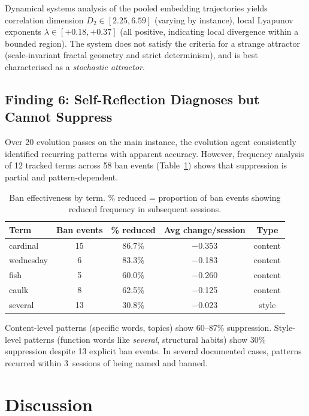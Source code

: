 \documentclass{article}
\begin{document}
Dynamical systems analysis of the pooled embedding trajectories yields
correlation dimension $D_2 \in [2.25, 6.59]$ (varying by instance), local
Lyapunov exponents $\lambda \in [+0.18, +0.37]$ (all positive, indicating
local divergence within a bounded region). The system does not satisfy the
criteria for a strange attractor (scale-invariant fractal geometry and strict
determinism), and is best characterised as a \emph{stochastic attractor}.

\subsection{Finding 6: Self-Reflection Diagnoses but Cannot Suppress}
\label{sec:selfreflect}

Over 20 evolution passes on the main instance, the evolution agent consistently
identified recurring patterns with apparent accuracy. However, frequency
analysis of 12 tracked terms across 58 ban events (Table~\ref{tab:bans}) shows
that suppression is partial and pattern-dependent.

\begin{table}[H]
\centering
\caption{Ban effectiveness by term. \% reduced = proportion of ban events
showing reduced frequency in subsequent sessions.}
\label{tab:bans}
\begin{tabular}{lcccc}
\toprule
\textbf{Term} & \textbf{Ban events} & \textbf{\% reduced} &
\textbf{Avg change/session} & \textbf{Type} \\
\midrule
cardinal  & 15 & 86.7\% & $-$0.353 & content \\
wednesday & 6  & 83.3\% & $-$0.183 & content \\
fish      & 5  & 60.0\% & $-$0.260 & content \\
caulk     & 8  & 62.5\% & $-$0.125 & content \\
several   & 13 & 30.8\% & $-$0.023 & style   \\
\bottomrule
\end{tabular}
\end{table}

Content-level patterns (specific words, topics) show 60--87\% suppression.
Style-level patterns (function words like \emph{several}, structural habits)
show 30\% suppression despite 13 explicit ban events. In several documented
cases, patterns recurred within 3~sessions of being named and banned.

\section{Discussion}
\label{sec:discussion}
\end{document}
